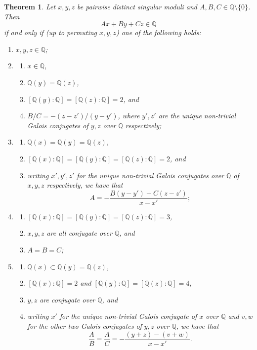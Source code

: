 \documentclass[11pt,a4paper, british]{amsart}
\newtheorem{thm}{Theorem}[section]
\theoremstyle{definition}
\theoremstyle{remark}
\numberwithin{equation}{section}
\newcommand{\Q}{\mathbb{Q}} %
\begin{document}
	\begin{thm}\label{thm:trip}
		Let $x, y, z$ be pairwise distinct singular moduli and $A, B, C \in \Q \setminus \{0\}$. Then
		\[ Ax + By + Cz \in \Q\]
		if and only if (up to permuting $x, y, z$) one of the following holds:
		\begin{enumerate}
			\item $x, y, z \in \Q$;
			\item	\begin{enumerate}
				\item $x \in \Q$,
				\item $\Q(y) = \Q(z)$,
				\item $[\Q(y) : \Q] = [\Q(z) : \Q] = 2$, and
				\item $B/C = -(z-z')/(y-y')$, where $y', z'$ are the unique non-trivial Galois conjugates of $y, z$ over $\Q$ respectively;
			\end{enumerate}
			\item 
			\begin{enumerate}
				\item $\Q(x) = \Q(y) = \Q(z)$, 
				\item $[\Q(x) : \Q] = [\Q(y) : \Q] = [\Q(z) : \Q] = 2$, and
				\item writing $x', y', z'$ for the unique non-trivial Galois conjugates over $\Q$ of $x, y, z$ respectively, we have that
				\[A = -\frac{B(y-y')+C(z-z')}{x-x'};\]
			\end{enumerate}
			\item 
			\begin{enumerate}
				\item $[\Q(x) : \Q] = [\Q(y) : \Q] = [\Q(z) : \Q] = 3$,
				\item $x, y, z$ are all conjugate over $\Q$, and
				\item $A= B = C$;
			\end{enumerate}
			\item \begin{enumerate}
				\item $\Q(x) \subset \Q(y) = \Q(z)$,
				\item $[\Q(x) : \Q] = 2$ and $[\Q(y) : \Q] = [\Q(z) : \Q] = 4$,
				\item $y, z$ are conjugate over $\Q$, and
				\item writing $x'$ for the unique non-trivial Galois conjugate of $x$ over $\Q$ and $v, w$ for the other two Galois conjugates of $y, z$ over $\Q$, we have that
				\[\frac{A}{B} = \frac{A}{C} = - \frac{(y+z) - (v+w)}{x - x'}.\]	
			\end{enumerate}
		\end{enumerate}
	\end{thm}
\end{document}
